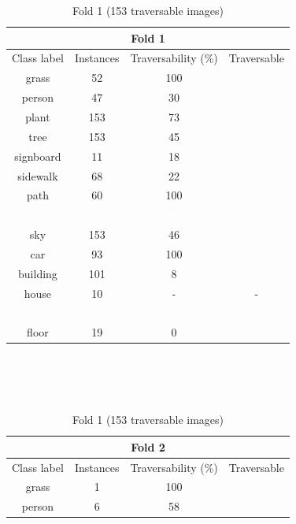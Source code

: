 \documentclass[12pt,a4paper,table,dvipsnames,tikz]{report}
\newcommand{\white}[1]{\textbf{\textcolor{white}{#1}}} %
\begin{document}
	
	\begin{table}[h!]
		\begin{subtable}[h!]{\textwidth}
			\centering
			\begin{tabular}{|c|c|c|c|}
				\hline
				\multicolumn{4}{|c|}{Fold 1}\\
				\hline
				Class label & Instances & Traversability (\%) & Traversable\\
				\hline\hline
				grass & 52 & 100 & \checkmark\\
				\hline
				person & 47 & 30 &\\
				\hline
				\rowcolor{plant}
				plant & 153 & 73 & \checkmark\\
				\hline
				\rowcolor{tree}
				tree & 153 & 45 &\\
				\hline
				signboard & 11 & 18 &\\
				\hline
				sidewalk & 68 & 22 &\\
				\hline
				path & 60 & 100 & \checkmark\\
				\hline
				\rowcolor{earth}
				\white{earth} & \white{153} & \white{46} &\\
				\hline
				\rowcolor{sky}
				sky & 153 & 46 &\\
				\hline
				car & 93 & 100 & \checkmark\\
				\hline
				\rowcolor{building}
				building & 101 & 8 &\\
				\hline
				\rowcolor{house}
				house & 10 & - & -\\
				\hline
				\rowcolor{wall}
				\white{wall} & \white{97} & \white{24} &\\
				\hline
				\rowcolor{floor}
				floor & 19 & 0 &\\
				\hline
			\end{tabular}
			\caption{Fold 1 (153 traversable images)}
			\label{table:trav.f1}
		\end{subtable}
		\\\\\\
		\begin{subtable}[h!]{\textwidth}
			\centering
			\begin{tabular}{|c|c|c|c|}
				\hline
				\multicolumn{4}{|c|}{Fold 2}\\
				\hline
				Class label & Instances & Traversability (\%) & Traversable\\
				\hline\hline
				grass & 1 & 100 & \checkmark\\
				\hline
				person & 6 & 58 & \checkmark\\

\end{tabular}
\end{subtable}
\end{table}
\end{document}
